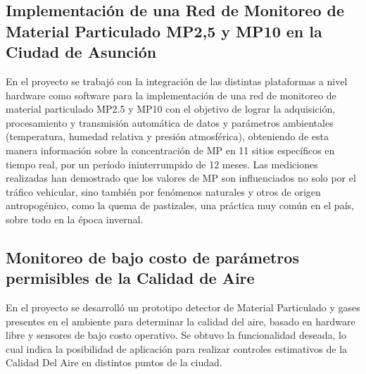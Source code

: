 \subsection{Implementación de una Red de Monitoreo de Material Particulado MP2,5 y MP10 en la Ciudad de Asunción}
En el proyecto \cite{Investigacion_niveles_MP} se trabajó con la integración de las distintas plataformas a nivel hardware como software para la implementación de una red de monitoreo de material particulado MP2.5 y MP10 con el objetivo de lograr la adquisición, procesamiento y transmisión automática de datos y parámetros ambientales (temperatura, humedad relativa y presión atmosférica), obteniendo de esta manera información sobre la concentración de MP en 11 sitios específicos en tiempo real, por un período ininterrumpido de 12 meses. Las mediciones realizadas han demostrado que los valores de MP son influenciados no solo por el tráfico vehicular, sino también por fenómenos naturales y otros de origen antropogénico, como la quema de pastizales, una práctica muy común en el país, sobre todo en la época invernal.

\subsection{Monitoreo de bajo costo de parámetros permisibles de la Calidad de Aire}
En el proyecto \cite{Monitoreo_bajo_costo} se desarrolló un prototipo detector de Material Particulado y gases presentes en el ambiente para determinar la calidad del aire, basado en hardware libre y sensores de bajo costo operativo. Se obtuvo la funcionalidad deseada, lo cual indica la posibilidad de aplicación para realizar controles estimativos de la Calidad Del Aire en distintos puntos de la ciudad.
